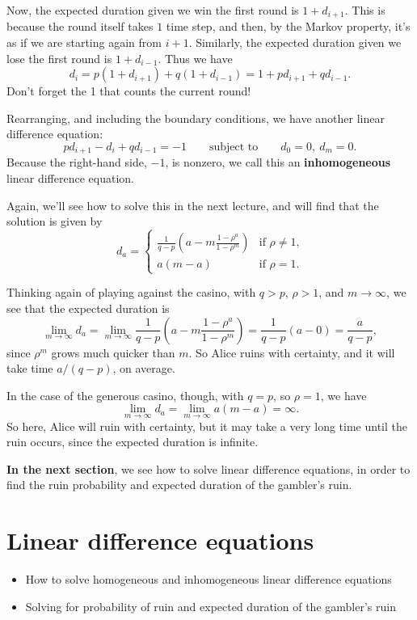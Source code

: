 \documentclass[
  a4paper,
]{article}
\providecommand{\tightlist}{%
  \setlength{\itemsep}{0pt}\setlength{\parskip}{0pt}}
\theoremstyle{definition}
\theoremstyle{definition}
\theoremstyle{definition}
\theoremstyle{remark}
\begin{document}
Now, the expected duration given we win the first round is \(1 + d_{i+1}\). This is because the round itself takes \(1\) time step, and then, by the Markov property, it's as if we are starting again from \(i+1\). Similarly, the expected duration given we lose the first round is \(1 + d_{i-1}\). Thus we have
\[ d_i = p(1 + d_{i+1}) + q (1 + d_{i-1}) = 1 + pd_{i+1} + qd_{i-1} . \]
Don't forget the 1 that counts the current round!

Rearranging, and including the boundary conditions, we have another linear difference equation:
\[ pd_{i+1} - d_i + qd_{i-1} = -1 \qquad \text{subject to} \qquad d_0 = 0,\ d_m = 0. \]
Because the right-hand side, \(-1\), is nonzero, we call this an \textbf{inhomogeneous} linear difference equation.

Again, we'll see how to solve this in the next lecture, and will find that the solution is given by
\[ d_a = \begin{cases} {\displaystyle \frac{1}{q-p} \left(a - m\frac{1-\rho^a}{1- \rho^m} \right)} & \text{if $\rho \neq 1$,} \\
\displaystyle a(m-a) & \text{if $\rho = 1$.} \end{cases} \]

Thinking again of playing against the casino, with \(q > p\), \(\rho > 1\), and \(m \to \infty\), we see that the expected duration is
\[ \lim_{m\to\infty} d_a = \lim_{m\to\infty} \frac{1}{q-p} \left(a - m\frac{1-\rho^a}{1 - \rho^m} \right)  = \frac{1}{q-p} \left(a - 0 \right) = \frac{a}{q-p} , \]
since \(\rho^m\) grows much quicker than \(m\). So Alice ruins with certainty, and it will take time \(a/(q-p)\), on average.

In the case of the generous casino, though, with \(q = p\), so \(\rho = 1\), we have
\[ \lim_{m\to\infty} d_a =  \lim_{m\to\infty} a(m-a) = \infty .  \]
So here, Alice will ruin with certainty, but it may take a very long time until the ruin occurs, since the expected duration is infinite.

\textbf{In the next section}, we see how to solve linear difference equations, in order to find the ruin probability and expected duration of the gambler's ruin.

\hypertarget{S04-ldes}{%
\section{Linear difference equations}\label{S04-ldes}}

\begin{itemize}
\tightlist
\item
  How to solve homogeneous and inhomogeneous linear difference equations
\item
  Solving for probability of ruin and expected duration of the gambler's ruin
\end{itemize}
\end{document}

